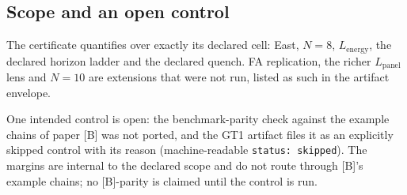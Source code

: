 \subsection{Scope and an open control}

The certificate quantifies over exactly its declared cell: East, $N=8$, $L_{\mathrm{energy}}$,
the declared horizon ladder and the declared quench. FA replication, the richer
$L_{\mathrm{panel}}$ lens and $N=10$ are extensions that were not run, listed as such in the
artifact envelope.

One intended control is open: the benchmark-parity check against the example chains of paper [B]
was not ported, and the GT1 artifact files it as an explicitly skipped control with its reason
(machine-readable \texttt{status: skipped}). The margins are internal to the declared scope and do
not route through [B]'s example chains; no [B]-parity is claimed until the control is run.
